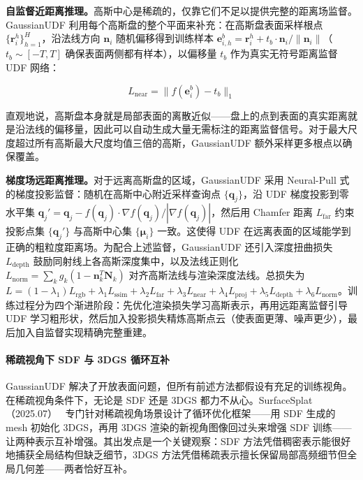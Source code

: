 \textbf{自监督近距离推理。}高斯中心是稀疏的，仅靠它们不足以提供完整的距离场监督。GaussianUDF 利用每个高斯盘的整个平面来补充：在高斯盘表面采样根点 $\{\mathbf{r}_i^h\}_{h=1}^H$，沿法线方向 $\mathbf{n}_i$ 随机偏移得到训练样本 $\mathbf{e}_{i,h}^b = \mathbf{r}_i^h + t_b \cdot \mathbf{n}_i / \|\mathbf{n}_i\|$（$t_b \sim [-T, T]$ 确保表面两侧都有样本），以偏移量 $t_b$ 作为真实无符号距离监督 UDF 网络：

\begin{equation}
L_{\text{near}} = \|f(\mathbf{e}_i^b) - t_b\|_1
\end{equation}

直观地说，高斯盘本身就是局部表面的离散近似——盘上的点到表面的真实距离就是沿法线的偏移量，因此可以自动生成大量无需标注的距离监督信号。对于最大尺度超过所有高斯最大尺度均值三倍的高斯，GaussianUDF 额外采样更多根点以确保覆盖。

\textbf{梯度场远距离推理。}对于远离高斯盘的区域，GaussianUDF 采用 Neural-Pull 式的梯度投影监督：随机在高斯中心附近采样查询点 $\{\mathbf{q}_j\}$，沿 UDF 梯度投影到零水平集 $\mathbf{q}_j' = \mathbf{q}_j - f(\mathbf{q}_j) \cdot \nabla f(\mathbf{q}_j) / |\nabla f(\mathbf{q}_j)|$，然后用 Chamfer 距离 $L_{\text{far}}$ 约束投影点集 $\{\mathbf{q}_j'\}$ 与高斯中心集 $\{\boldsymbol{\mu}_i\}$ 一致。这使得 UDF 在远离表面的区域能学到正确的粗粒度距离场。为配合上述监督，GaussianUDF 还引入深度扭曲损失 $L_{\text{depth}}$ 鼓励同射线上各高斯深度集中，以及法线正则化 $L_{\text{norm}} = \sum_k g_k (1 - \mathbf{n}_k^T \mathbf{N}_k)$ 对齐高斯法线与渲染深度法线。总损失为 $L = (1-\lambda_1)L_{\text{rgb}} + \lambda_1 L_{\text{ssim}} + \lambda_2 L_{\text{far}} + \lambda_3 L_{\text{near}} + \lambda_4 L_{\text{proj}} + \lambda_5 L_{\text{depth}} + \lambda_6 L_{\text{norm}}$。训练过程分为四个渐进阶段：先优化渲染损失学习高斯表示，再用远距离监督引导 UDF 学习粗形状，然后加入投影损失精炼高斯点云（使表面更薄、噪声更少），最后加入自监督实现精确完整重建。

\paragraph{稀疏视角下 SDF 与 3DGS 循环互补}

GaussianUDF 解决了开放表面问题，但所有前述方法都假设有充足的训练视角。在稀疏视角条件下，无论是 SDF 还是 3DGS 都力不从心。SurfaceSplat（2025.07）~\cite{2507_15602} 专门针对稀疏视角场景设计了循环优化框架——用 SDF 生成的 mesh 初始化 3DGS，再用 3DGS 渲染的新视角图像回过头来增强 SDF 训练——让两种表示互补增强。其出发点是一个关键观察：SDF 方法凭借稠密表示能很好地捕获全局结构但缺乏细节，3DGS 方法凭借稀疏表示擅长保留局部高频细节但全局几何差——两者恰好互补。

